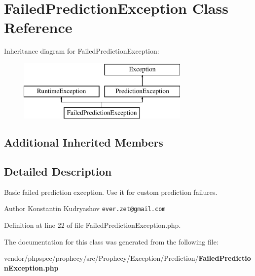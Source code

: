 \section{Failed\+Prediction\+Exception Class Reference}
\label{class_prophecy_1_1_exception_1_1_prediction_1_1_failed_prediction_exception}
Inheritance diagram for Failed\+Prediction\+Exception\+:\begin{figure}[H]
\begin{center}
\leavevmode
\includegraphics[height=3.000000cm]{class_prophecy_1_1_exception_1_1_prediction_1_1_failed_prediction_exception}
\end{center}
\end{figure}
\subsection*{Additional Inherited Members}


\subsection{Detailed Description}
Basic failed prediction exception. Use it for custom prediction failures.

\begin{DoxyAuthor}{Author}
Konstantin Kudryashov {\tt ever.\+zet@gmail.\+com} 
\end{DoxyAuthor}


Definition at line 22 of file Failed\+Prediction\+Exception.\+php.



The documentation for this class was generated from the following file\+:\begin{DoxyCompactItemize}
\item 
vendor/phpspec/prophecy/src/\+Prophecy/\+Exception/\+Prediction/{\bf Failed\+Prediction\+Exception.\+php}\end{DoxyCompactItemize}
